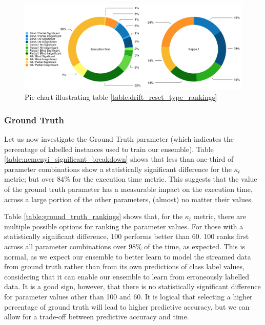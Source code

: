 \begin{figure}
  \includegraphics[width=\linewidth]{./images/chapter5/drift_reset_type_rankings_pie}
\caption{\label{fig:drift_reset_type_rankings_pie}Pie chart illustrating table \ref{table:drift_reset_type_rankings}}
\end{figure}

\subsubsection{Ground Truth}

Let us now investigate the Ground Truth parameter (which indicates the percentage of labelled instances used to train our ensemble). Table \ref{table:nemenyi_significant_breakdown} shows that less than one-third of parameter combinations show a statistically significant difference for the $\kappa_t$ metric; but over $84\%$ for the execution time metric. This suggests that the value of the ground truth parameter has a measurable impact on the execution time, across a large portion of the other parameters, (almost) no matter their values.

Table \ref{table:ground_truth_rankings} shows that, for the $\kappa_t$ metric, there are multiple possible options for ranking the parameter values. For those with a statistically significant difference, 100 performs better than 60. 100 ranks first across all parameter combinations over $98\%$ of the time, as expected. This is normal, as we expect our ensemble to better learn to model the streamed data from ground truth rather than from its own predictions of class label values, considering that it can enable our ensemble to learn from erroneously labelled data. It is a good sign, however, that there is no statistically significant difference for parameter values other than 100 and 60. It is logical that selecting a higher percentage of ground truth will lead to higher predictive accuracy, but we can allow for a trade-off between predictive accuracy and time.


